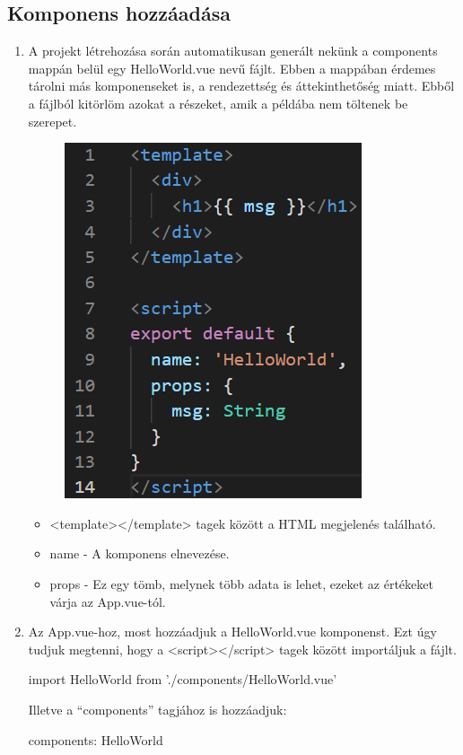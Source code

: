 \subsection{Komponens hozzáadása}
\begin{enumerate}
	\item A projekt létrehozása során automatikusan generált nekünk a components mappán belül egy HelloWorld.vue nevű fájlt. Ebben a mappában érdemes tárolni más komponenseket is, a rendezettség és áttekinthetőség miatt. Ebből a fájlból kitörlöm azokat a részeket, amik a példába nem töltenek be szerepet. 
	\begin{figure}[h!]
	\centering
	\includegraphics[scale=0.25]{images/14dfb7fd47c01c0cd6d8692ca740c349.png}
	\label{fig:ff}
	\end{figure}
	\begin{itemize}
		\item <template></template> tagek között a HTML megjelenés található.
		\item name - A komponens elnevezése.
		\item props - Ez egy tömb, melynek több adata is lehet, ezeket az értékeket várja az App.vue-tól.
	\end{itemize}
	\item Az App.vue-hoz, most hozzáadjuk a HelloWorld.vue komponenst. Ezt úgy tudjuk megtenni, hogy a <script></script> tagek között importáljuk a fájlt.
	\begin{javascript}
import HelloWorld from './components/HelloWorld.vue'
\end{javascript}
	Illetve a “components” tagjához is hozzáadjuk:
\begin{javascript}
components: {
	HelloWorld
}
	\end{javascript}


\end{enumerate}
